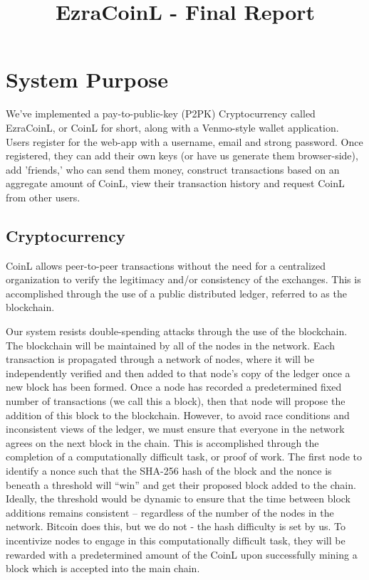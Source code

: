 \documentclass[12pt]{article}
\title{EzraCoinL - Final Report}
\author{
\iam{James Cassell}{jcc384}
\and
\iam{Evan King}{esk79}
\and
\iam{Ethan Koenig}{etk39}
\and
\iam{Eric Perdew}{ecp84}
\and
\iam{Will Ronchetti}{wrr33}
}
\begin{document}
\maketitle

\section{System Purpose}

We've  implemented a pay-to-public-key (P2PK) Cryptocurrency called EzraCoinL, or CoinL for short, along with a Venmo-style wallet application. Users register for the web-app with a username, email and strong password. Once registered, they can add their own keys (or have us generate them browser-side), add 'friends,' who can send them money, construct transactions based on an aggregate amount of CoinL, view their transaction history and request CoinL from other users.

\subsection*{Cryptocurrency}

CoinL allows peer-to-peer transactions without the need for a centralized organization to verify the legitimacy and/or consistency of the exchanges.  This is accomplished through the use of a public distributed ledger, referred to as the blockchain.

Our system resists double-spending attacks through the use of the blockchain. The blockchain will be maintained by all of the nodes in the network. Each transaction is propagated through a network of nodes, where it will be independently verified and then added to that node's copy of the ledger once a new block has been formed. Once a node has recorded a predetermined fixed number of transactions (we call this a block), then that node will propose the addition of this block to the blockchain. However, to avoid race conditions and inconsistent views of the ledger, we must ensure that everyone in the network agrees on the next block in the chain. This is accomplished through the completion of a computationally difficult task, or proof of work. The first node to identify a nonce such that the SHA-256 hash of the block and the nonce is beneath a threshold will ``win'' and get their proposed block added to the chain. Ideally, the threshold would be dynamic to ensure that the time between block additions remains consistent -- regardless of the number of the nodes in the network. Bitcoin does this, but we do not - the hash difficulty is set by us.  To incentivize nodes to engage in this computationally difficult task, they will be rewarded with a predetermined amount of the CoinL upon successfully mining a block which is accepted into the main chain.
\end{document}
